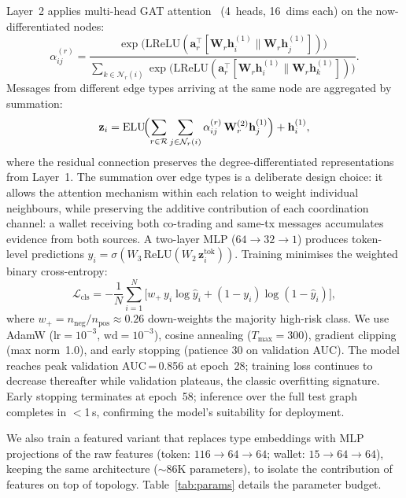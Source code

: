 \documentclass[10pt,journal]{IEEEtran}
\begin{document}
Layer~2 applies multi-head GAT attention~\cite{velickovic2018gat}
(4~heads, 16~dims each) on the now-differentiated nodes:
\begin{equation}
  \alpha_{ij}^{(r)} = \frac{
    \exp\!\bigl(\mathrm{LReLU}(\mathbf{a}_r^\top
    [\mathbf{W}_r\mathbf{h}_i^{(1)} \| \mathbf{W}_r\mathbf{h}_j^{(1)}])\bigr)
  }{
    \sum_{k\in\mathcal{N}_r(i)} \exp\!\bigl(\mathrm{LReLU}(\mathbf{a}_r^\top
    [\mathbf{W}_r\mathbf{h}_i^{(1)} \| \mathbf{W}_r\mathbf{h}_k^{(1)}])\bigr)
  }.
  \label{eq:gat}
\end{equation}
Messages from different edge types arriving at the same node are
aggregated by summation:
\begin{equation}
  \mathbf{z}_i = \mathrm{ELU}\!\Bigl(
    \sum_{r \in \mathcal{R}} \sum_{j\in\mathcal{N}_r(i)}
    \alpha_{ij}^{(r)}\, \mathbf{W}_r^{(2)}\mathbf{h}_j^{(1)}\Bigr)
    + \mathbf{h}_i^{(1)},
  \label{eq:hetero_agg}
\end{equation}
where the residual connection preserves the degree-differentiated
representations from Layer~1. The summation over edge types is a
deliberate design choice: it allows the attention mechanism within
each relation to weight individual neighbours, while preserving the
additive contribution of each coordination channel: a wallet
receiving both co-trading and same-tx messages accumulates evidence
from both sources. A two-layer MLP ($64\to32\to1$) produces token-level predictions
$\hat{y}_i = \sigma(W_3\,\mathrm{ReLU}(W_2\,\mathbf{z}_i^{\text{tok}}))$.
Training minimises the weighted binary cross-entropy:
\begin{equation}
  \mathcal{L}_{\text{cls}} = -\frac{1}{N}\sum_{i=1}^{N}\bigl[
    w_+\,y_i\log\hat{y}_i + (1{-}y_i)\log(1{-}\hat{y}_i)\bigr],
  \label{eq:bce}
\end{equation}
where $w_+{=}n_{\text{neg}}/n_{\text{pos}}{\approx}0.26$ down-weights
the majority high-risk class. We use AdamW ($\text{lr}{=}10^{-3}$,
$\text{wd}{=}10^{-3}$), cosine annealing ($T_{\max}{=}300$), gradient
clipping (max norm~1.0), and early stopping (patience 30 on validation
AUC). The model reaches peak validation AUC\,=\,0.856 at epoch~28;
training loss continues to decrease thereafter while validation
plateaus, the classic overfitting signature. Early stopping terminates
at epoch~58; inference over the full test graph completes in
$<$1\,s, confirming the model's suitability for deployment.

We also train a featured variant that replaces type
embeddings with MLP projections of the raw features (token:
$116\to64\to64$; wallet: $15\to64\to64$), keeping the same architecture
(${\sim}86$K parameters), to isolate the contribution of features on
top of topology. Table~\ref{tab:params} details the parameter budget.
\end{document}
